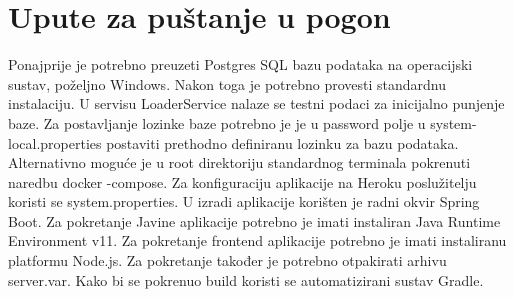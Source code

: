 			\eject 
		
		\section{Upute za puštanje u pogon}
			
			
			Ponajprije je potrebno preuzeti Postgres SQL bazu podataka na operacijski sustav, poželjno Windows. Nakon toga je potrebno provesti standardnu instalaciju. U servisu LoaderService nalaze se testni podaci za inicijalno punjenje baze. Za postavljanje lozinke baze potrebno je je u password polje u system-local.properties postaviti prethodno definiranu lozinku za bazu podataka. Alternativno moguće je u root direktoriju standardnog terminala  pokrenuti naredbu docker -compose. Za konfiguraciju aplikacije na Heroku poslužitelju koristi se system.properties.
			U izradi aplikacije korišten je radni okvir Spring Boot. Za pokretanje Javine aplikacije
			potrebno je imati instaliran Java Runtime Environment v11. Za pokretanje frontend aplikacije
			potrebno je imati instaliranu platformu Node.js. Za pokretanje također je potrebno otpakirati 
			arhivu server.var. Kako bi se pokrenuo build koristi se automatizirani sustav Gradle. 
			
			\eject 